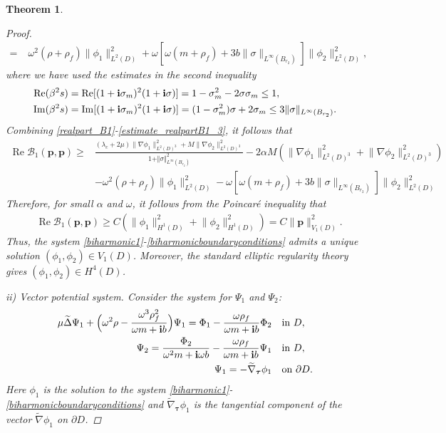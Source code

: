 \documentclass[11pt]{article}
\newcommand{\pa}{\partial}
\newcommand{\om}{\omega}
\newcommand{\sig}{\sigma}
\newcommand{\la}{\lambda}
\newcommand{\wid}{\widetilde}
\newcommand{\bs}{\boldsymbol}
\newtheorem{theorem}{Theorem}[section]
\providecommand{\Rp}{\operatorname{Re}}%
\providecommand{\Ip}{\operatorname{Im}}%
\begin{document}
\begin{theorem}
\begin{proof}
\begin{equation}
\begin{aligned}
= &\; \om^2(\rho+\rho_f)\|\phi_1\|_{L^2(D)}^2+\om\left[\om(m+\rho_f)+
3 b\|\sig\|_{L^{\infty}(B_{r_2})}\right]\|\phi_2\|_{L^2(D)}^2,
\end{aligned}
\end{equation}
where we have used the estimates in the second inequality
\begin{equation*}
\begin{aligned}
\Rp(\beta^2s) &= \Rp[(1+{\bf i}\sig_m)^2(1+{\bf i}\sig)] 
= 1-\sig_m^2-2\sig\sig_m\leq 1,\\
\Ip(\beta^2s) &= \Ip[(1+{\bf i}\sig_m)^2(1+{\bf i}\sig)] 
= (1-\sig_m^2)\sig+2\sig_m\leq 3\|\sig\|_{L^{\infty}(B_{r_2})}.
\end{aligned}
\end{equation*}  
Combining \eqref{realpart_B1}-\eqref{estimate_realpartB1_3}, it follows that 
$$\begin{aligned}
\Rp\mathcal{B}_{1}(\bs{p},\bs{p})
\geq &\frac{(\la_c+2\mu)\lVert \nabla \phi_1 \rVert_{{L^2(D)^3}}^2
+M\lVert \nabla \phi_2 \rVert_{{L^2(D)^3}}^2}{1+\Vert\sig\Vert_{L^{\infty}
(B_{r_2})}^2}-2\alpha M\left(\lVert \nabla \phi_1 \rVert_{{L^2(D)^3}}^2+
\lVert \nabla \phi_2 \rVert_{{L^2(D)^3}}^2\right)\\
&-\om^2(\rho+\rho_f)\|\phi_1\|_{L^2(D)}^2-\om\left[\om(m+\rho_f)+
3 b\|\sig\|_{L^{\infty}(B_{r_2})}\right]\|\phi_2\|_{L^2(D)}^2
\end{aligned}
$$ 
Therefore, for small $\alpha$ and $\omega$, it follows from the Poincaré inequality that
$$\begin{aligned}
&\Rp\mathcal{B}_{1}(\bs{p},\bs{p})\geq C( \lVert \phi_1\rVert_{H^1(D)}^2+
\lVert \phi_2\rVert_{H^1(D)}^2)=C\lVert \bs{p} \rVert_{V_1(D)}^2.
\end{aligned}
$$ 
Thus, the system \eqref{biharmonic1}-\eqref{biharmonicboundaryconditions} 
admits a unique solution $(\phi_1,\phi_2) \in V_1(D)$. Moreover, the standard 
elliptic regularity theory gives $(\phi_1,\phi_2) \in H^4(D)$.

ii) \textit{Vector potential system.} Consider the system for ${\Psi_1}$ and ${\Psi_2}$:
\begin{align}\label{maxwell1}
\mu\wid{\Delta} \Psi_1+\Big(\omega^2\rho -\frac{\omega^3\rho_f^2}{\omega m+{\bf i}b}\Big)\Psi_1
=\Phi_1-\frac{\omega\rho_f}{\omega m+{\bf i}b}\Phi_2 & \quad\text{in }  D,\\ \label{maxwell2}
\Psi_2=\frac{\Phi_2}{\omega^2m+{\bf i}\omega b}-\frac{\omega\rho_f}{\omega m+
{\bf i}b}\Psi_1 & \quad\text{in }  D,\\ \label{pmlmaxwellboundaryconditions}
\Psi_1=-\wid{\nabla}_{\bs{\tau}}\phi_1 &\quad \text{on } \pa D.
\end{align}
Here $\phi_1$ is the solution to the system \eqref{biharmonic1}-\eqref{biharmonicboundaryconditions} 
and $\wid{\nabla}_{\bs{\tau}}\phi_1$ is the tangential component of the vector
$\wid{\nabla}\phi_1$ on $\pa D$.


\end{proof}
\end{theorem}
\end{document}
